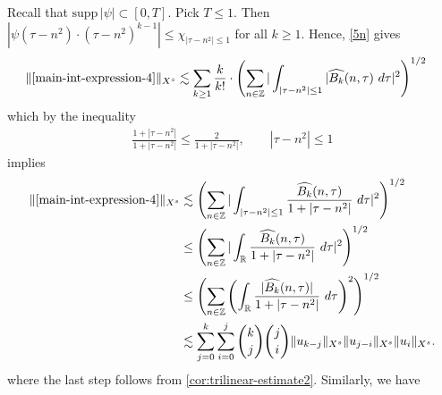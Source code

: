 \documentclass[12pt,reqno]{amsart}
\numberwithin{equation}{section}  %
\numberwithin{figure}{section}
\newcommand{\rr}{\mathbb{R}}
\newcommand{\zz}{\mathbb{Z}}
\newcommand{\wh}{\widehat}
\theoremstyle{plain}
\theoremstyle{definition}
\theoremstyle{remark}
\begin{document}
%
Recall that $\text{supp} \, |\psi| \subset [0, T ]$. Pick $T \le 1$. 
Then $| \psi\left( \tau - n^{2} \right) \cdot \left( \tau - n^{2} \right)^{k 
-1} | \le \chi_{| \tau - n^{2} | \le 1}$ for all $k \ge 1$. Hence, \eqref{5n} gives
%
\begin{equation*}
  \begin{split}
    \|\eqref{main-int-expression-4} \|_{X^s} 
    & \lesssim \sum_{k \ge 1} \frac{k}{k!} \cdot \left( \sum_{n \in \zz} | 
    \int_{| \tau - n^{2}  |\le 1} | \wh{{B_k}}(n, \tau) \ d \tau |^2 
    \right)^{1/2}
  \end{split}
\end{equation*}
%
which by the inequality
%
\begin{equation*}
  \begin{split}
    \frac{1 + | \tau - n^{2} |}{1 + | \tau  - n^{2} |} \le 
    \frac{2}{1 + | \tau - n^{2} |}, \qquad | \tau - n^{2}  | \le 1
  \end{split}
\end{equation*}
%
implies
%
\begin{equation}
\label{main-int4-est-X-s-part}
  \begin{split}
    \|\eqref{main-int-expression-4}\|_{X^s}
    & \lesssim \left( \sum_{n \in \zz} | \int_{| \tau - n^{2}| \le 1 }
    \frac{\wh{{B_k}}(n, \tau)}{1 + | \tau - n^{2} |} \ d \tau |^2 
    \right)^{1/2}
    \\
    & \le \left( \sum_{n \in \zz} | \int_\rr
    \frac{\wh{{B_k}}(n, \tau)}{1 + | \tau - n^{2} |} \ d \tau |^2 
    \right)^{1/2} \\
    & \le \left( \sum_{n \in \zz} \left( \int_\rr 
    \frac{|\wh{{B_k}}(n, \tau)|}{1 + | \tau - n^{2} |}  \ d \tau  \right)^2
    \right)^{1/2} \\
    & \lesssim 
    \sum_{j=0}^{k} \sum_{i=0}^{j} {k \choose j}{j \choose i}
    \|u_{k-j}\|_{X^s} \| u_{j-i}\|_{X^s}
    \| u_i \|_{X^s}.
  \end{split}
\end{equation}
%
where the last step follows from \cref{cor:trilinear-estimate2}. Similarly,
we have
%
%
\end{document}
